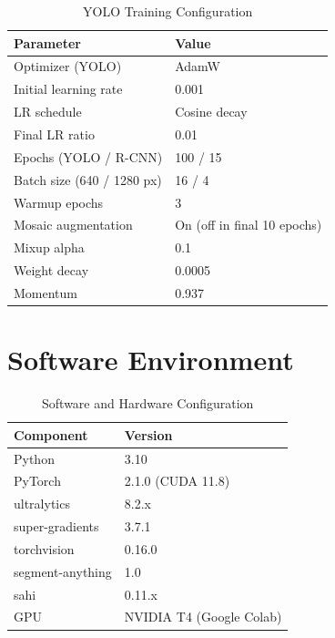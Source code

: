 \documentclass[conference]{IEEEtran}
\begin{document}
\begin{table}[H]
\caption{YOLO Training Configuration}
\label{tab:hyperparams}
\begin{center}
\begin{tabular}{ll}
\toprule
\textbf{Parameter} & \textbf{Value} \\
\midrule
Optimizer (YOLO)       & AdamW \\
Initial learning rate  & 0.001 \\
LR schedule            & Cosine decay \\
Final LR ratio         & 0.01 \\
Epochs (YOLO / R-CNN)  & 100 / 15 \\
Batch size (640 / 1280 px) & 16 / 4 \\
Warmup epochs          & 3 \\
Mosaic augmentation    & On (off in final 10 epochs) \\
Mixup alpha            & 0.1 \\
Weight decay           & 0.0005 \\
Momentum               & 0.937 \\
\bottomrule
\end{tabular}
\end{center}
\end{table}

\section{Software Environment}

\begin{table}[H]
\caption{Software and Hardware Configuration}
\label{tab:env}
\begin{center}
\begin{tabular}{ll}
\toprule
\textbf{Component}     & \textbf{Version} \\
\midrule
Python                 & 3.10 \\
PyTorch                & 2.1.0 (CUDA 11.8) \\
ultralytics            & 8.2.x \\
super-gradients        & 3.7.1 \\
torchvision            & 0.16.0 \\
segment-anything       & 1.0 \\
sahi                   & 0.11.x \\
GPU                    & NVIDIA T4 (Google Colab) \\
\bottomrule
\end{tabular}
\end{center}
\end{table}
\end{document}
